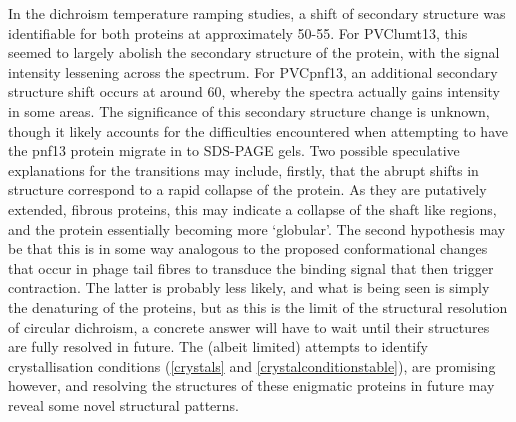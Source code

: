 In the dichroism temperature ramping studies, a shift of secondary structure was identifiable for both proteins at approximately 50-55\degC. For PVClumt13, this seemed to largely abolish the secondary structure of the protein, with the signal intensity lessening across the spectrum. For PVCpnf13, an additional secondary structure shift occurs at around 60\degC{}, whereby the spectra actually gains intensity in some areas. The significance of this secondary structure change is unknown, though it likely accounts for the difficulties encountered when attempting to have the pnf13 protein migrate in to SDS-PAGE gels. Two possible speculative explanations for the transitions may include, firstly, that the abrupt shifts in structure correspond to a rapid collapse of the protein. As they are putatively extended, fibrous proteins, this may indicate a collapse of the shaft like regions, and the protein essentially becoming more `globular'. The second hypothesis may be that this is in some way analogous to the proposed conformational changes that occur in phage tail fibres to transduce the binding signal that then trigger contraction. The latter is probably less likely, and what is being seen is simply the denaturing of the proteins, but as this is the limit of the structural resolution of circular dichroism, a concrete answer will have to wait until their structures are fully resolved in future. The (albeit limited) attempts to identify crystallisation conditions (\vref{crystals} and \vref{crystalconditionstable}), are promising however, and resolving the structures of these enigmatic proteins in future may reveal some novel structural patterns.


